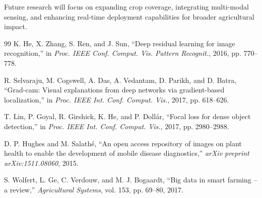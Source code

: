 \documentclass[journal,twocolumn,10pt]{IEEEtran}
\begin{document}
Future research will focus on expanding crop coverage, integrating multi-modal sensing, and enhancing real-time deployment capabilities for broader agricultural impact.

\begin{thebibliography}{99}
 K. He, X. Zhang, S. Ren, and J. Sun, ``Deep residual learning for image recognition,'' in \emph{Proc. IEEE Conf. Comput. Vis. Pattern Recognit.}, 2016, pp. 770--778.

 R. Selvaraju, M. Cogswell, A. Das, A. Vedantam, D. Parikh, and D. Batra, ``Grad-cam: Visual explanations from deep networks via gradient-based localization,'' in \emph{Proc. IEEE Int. Conf. Comput. Vis.}, 2017, pp. 618--626.

 T. Lin, P. Goyal, R. Girshick, K. He, and P. Dollár, ``Focal loss for dense object detection,'' in \emph{Proc. IEEE Int. Conf. Comput. Vis.}, 2017, pp. 2980--2988.

 D. P. Hughes and M. Salathé, ``An open access repository of images on plant health to enable the development of mobile disease diagnostics,'' \emph{arXiv preprint arXiv:1511.08060}, 2015.

 S. Wolfert, L. Ge, C. Verdouw, and M. J. Bogaardt, ``Big data in smart farming – a review,'' \emph{Agricultural Systems}, vol. 153, pp. 69--80, 2017.
\end{thebibliography}
\end{document}
